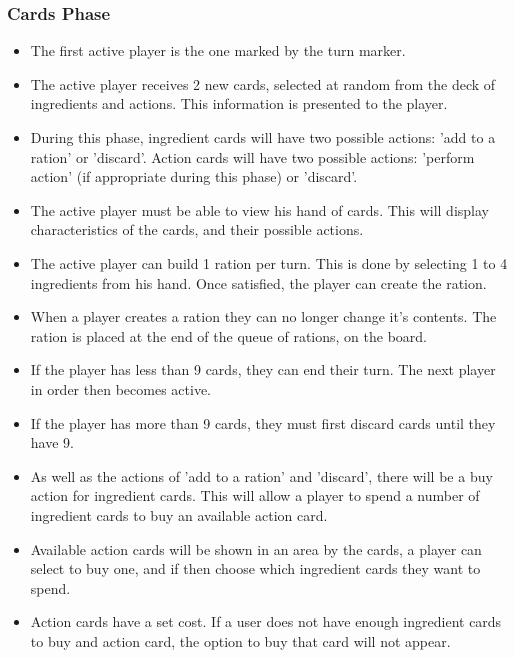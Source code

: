 	\subsubsection{Cards Phase}
	  \begin{itemize}
	  	\item \pA The first active player is the one marked by the turn marker.
	  	\item \pA The active player receives 2 new cards, selected at random from the deck of ingredients and actions. This information is presented to the player.
	  	\item \pA During this phase, ingredient cards will have two possible actions: 'add to a ration' or 'discard'. Action cards will have two possible actions: 'perform action' (if appropriate during this phase) or 'discard'.
	  	\item \pA The active player must be able to view his hand of cards. This will display characteristics of the cards, and their possible actions.
	  	\item \pA The active player can build 1 ration per turn. This is done by selecting 1 to 4 ingredients from his hand. Once satisfied, the player can create the ration. 
	  	\item \pA When a player creates a ration they can no longer change it's contents. The ration is placed at the end of the queue of rations, on the board.
	  	\item \pA If the player has less than 9 cards, they can end their turn. The next player in order then becomes active.
	  	\item \pA If the player has more than 9 cards, they must first discard cards until they have 9.
	  	\item \pD As well as the actions of 'add to a ration' and 'discard', there will be a buy action for ingredient cards. This will allow a player to spend a number of ingredient cards to buy an available action card.
	  	\item \pD Available action cards will be shown in an area by the cards, a player can select to buy one, and if then choose which ingredient cards they want to spend.
	  	\item \pD Action cards have a set cost. If a user does not have enough ingredient cards to buy and action card, the option to buy that card will not appear. 
	  \end{itemize}
